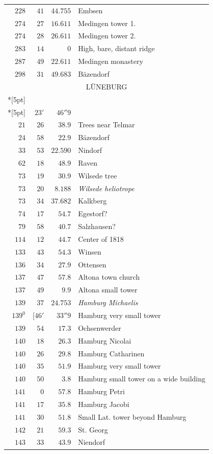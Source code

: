 \begin{longtable}{@{}rrrp{.61\linewidth}@{}}
\(228\)&\(41\)&\(44.755\)&\raggedright Embsen\tabularnewline
\(274\)&\(27\)&\(16.611\)&\raggedright Medingen tower 1.\tabularnewline
\(274\)&\(28\)&\(26.611\)&\raggedright Medingen tower 2.\tabularnewline
\(283\)&\(14\)&\(0\)&\raggedright High, bare, distant ridge\tabularnewline
\(287\)&\(49\)&\(22.611\)&\raggedright Medingen monastery\tabularnewline
\(298\)&\(31\)&\(49.683\)&\raggedright Bäzendorf\tabularnewline
\multicolumn{4}{c}{\strut LÜNEBURG}\\*[5pt]
\multicolumn{4}{c}{Main station \(-191597.163\)\qquad\(-30574.951\)}\\*[5pt]
\multicolumn{3}{r}{\begin{tabular}{@{}rrr|@{}}\(21^{0}\)&\(23'\)&\(46''9\)\\
\(21\)&\(26\)&\(38.9\)\end{tabular}}&\raggedright Trees near Telmar\tabularnewline
\(24\)&\(58\)&\(22.9\)&\raggedright Bäzendorf\tabularnewline
\(33\)&\(53\)&\(22.590\)&\raggedright Nindorf\tabularnewline
\(62\)&\(18\)&\(48.9\)&\raggedright Raven\tabularnewline
\(73\)&\(19\)&\(30.9\)&\raggedright Wilsede tree\tabularnewline
\(73\)&\(20\)&\(8.188\)&\raggedright \textit{Wilsede heliotrope}\tabularnewline
\(73\)&\(34\)&\(37.682\)&\raggedright Kalkberg\tabularnewline
\(74\)&\(17\)&\(54.7\)&\raggedright Egestorf?\tabularnewline
\(79\)&\(58\)&\(40.7\)&\raggedright Salzhausen?\tabularnewline
\(114\)&\(12\)&\(44.7\)&\raggedright Center of 1818\tabularnewline
\(133\)&\(43\)&\(54.3\)&\raggedright Winsen\tabularnewline
\(136\)&\(34\)&\(27.9\)&\raggedright Ottensen\tabularnewline
\(137\)&\(47\)&\(57.8\)&\raggedright Altona town church\tabularnewline
\(137\)&\(49\)&\(9.9\)&\raggedright Altona small tower\tabularnewline
\(139\)&\(37\)&\(24.753\)&\raggedright \textit{Hamburg Michaelis}\tabularnewline
\(139^{0}\)&\([46'\)&\(33''9\)&\raggedright Hamburg very small tower\tabularnewline
\(139\)&\(54\)&\(17.3\)&\raggedright Ochsenwerder\tabularnewline
\(140\)&\(18\)&\(26.3\)&\raggedright Hamburg Nicolai\tabularnewline
\(140\)&\(26\)&\(29.8\)&\raggedright Hamburg Catharinen\tabularnewline
\(140\)&\(35\)&\(51.9\)&\raggedright Hamburg very small tower\tabularnewline
\(140\)&\(50\)&\(3.8\)&\raggedright Hamburg small tower on a wide building\tabularnewline
\(141\)&\(0\)&\(57.8\)&\raggedright Hamburg Petri\tabularnewline
\(141\)&\(17\)&\(35.8\)&\raggedright Hamburg Jacobi\tabularnewline
\(141\)&\(30\)&\(51.8\)&\raggedright Small Lat. tower beyond Hamburg\tabularnewline
\(142\)&\(21\)&\(59.3\)&\raggedright St. Georg\tabularnewline
\(143\)&\(33\)&\(43.9\)&\raggedright Niendorf\tabularnewline

\end{longtable}
